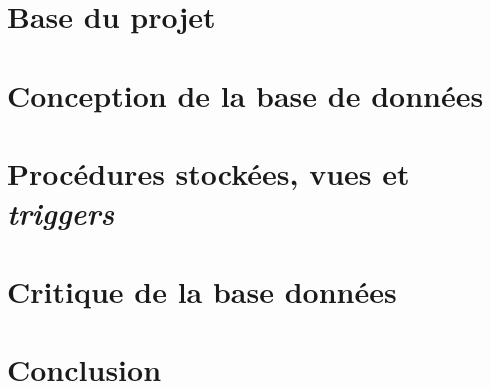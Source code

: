 \documentclass[a4paper]{article}
\begin{document}
\newpage

\section{Base du projet}
    
    
\section{Conception de la base de données}	
    
    
\section{Procédures stockées, vues et \textit{triggers}}
    

\section{Critique de la base données}
    

\newpage

\section*{Conclusion}
    

\newpage

\listoffigures
\end{document}
